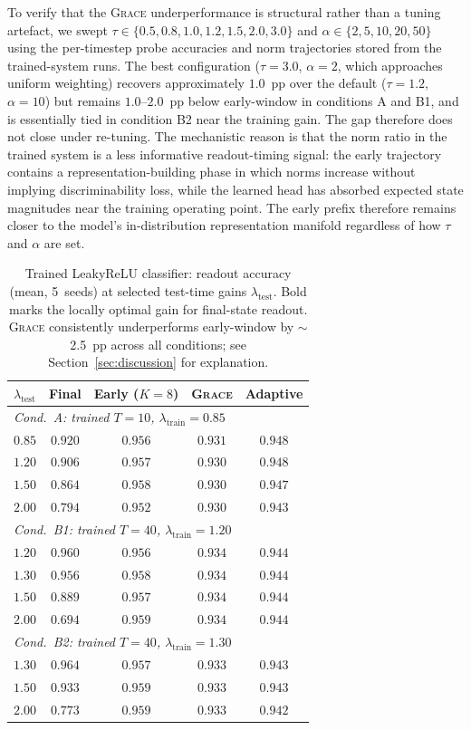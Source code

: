 \documentclass{article}
\theoremstyle{remark}
\newcommand{\grace}{\textnormal{\textsc{Grace}}}
\begin{document}
To verify that the \grace{} underperformance is structural rather than a
tuning artefact, we swept $\tau \in \{0.5, 0.8, 1.0, 1.2, 1.5, 2.0,
3.0\}$ and $\alpha \in \{2, 5, 10, 20, 50\}$ using the per-timestep probe
accuracies and norm trajectories stored from the trained-system runs. The best
configuration ($\tau=3.0$, $\alpha=2$, which approaches uniform weighting)
recovers approximately $1.0$~pp over the default ($\tau=1.2$, $\alpha=10$)
but remains $1.0$--$2.0$~pp below early-window in conditions A and B1, and
is essentially tied in condition B2 near the training gain.
The gap therefore does not close under re-tuning. The mechanistic reason is
that the norm ratio in the trained system is a less informative readout-timing
signal: the early trajectory contains a representation-building phase in
which norms increase without implying discriminability loss, while the
learned head has absorbed expected state magnitudes near the training
operating point. The early prefix therefore remains closer to the model's
in-distribution representation manifold regardless of how $\tau$ and
$\alpha$ are set.

\begin{table}[H]
\centering
\caption{Trained LeakyReLU classifier: readout accuracy (mean, 5~seeds) at
selected test-time gains $\lambda_{\text{test}}$. Bold marks the locally
optimal gain for final-state readout. \grace{} consistently underperforms
early-window by $\sim$2.5~pp across all conditions; see Section~\ref{sec:discussion}
for explanation.}
\label{tab:e6}
\small
\begin{tabular}{l cccc}
\toprule
$\lambda_{\text{test}}$ & Final & Early ($K{=}8$) & \grace{} & Adaptive \\
\midrule
\multicolumn{5}{l}{\textit{Cond.\ A: trained $T{=}10$, $\lambda_{\text{train}}{=}0.85$}} \\
$0.85$ & $0.920$ & $0.956$ & $0.931$ & $0.948$ \\
$1.20$ & $0.906$ & $0.957$ & $0.930$ & $0.948$ \\
$1.50$ & $0.864$ & $0.958$ & $0.930$ & $0.947$ \\
$2.00$ & $0.794$ & $0.952$ & $0.930$ & $0.943$ \\
\midrule
\multicolumn{5}{l}{\textit{Cond.\ B1: trained $T{=}40$, $\lambda_{\text{train}}{=}1.20$}} \\
$1.20$ & $\mathbf{0.960}$ & $0.956$ & $0.934$ & $0.944$ \\
$1.30$ & $0.956$ & $0.958$ & $0.934$ & $0.944$ \\
$1.50$ & $0.889$ & $0.957$ & $0.934$ & $0.944$ \\
$2.00$ & $0.694$ & $0.959$ & $0.934$ & $0.944$ \\
\midrule
\multicolumn{5}{l}{\textit{Cond.\ B2: trained $T{=}40$, $\lambda_{\text{train}}{=}1.30$}} \\
$1.30$ & $\mathbf{0.964}$ & $0.957$ & $0.933$ & $0.943$ \\
$1.50$ & $0.933$ & $0.959$ & $0.933$ & $0.943$ \\
$2.00$ & $0.773$ & $0.959$ & $0.933$ & $0.942$ \\
\bottomrule
\end{tabular}
\end{table}
\end{document}
